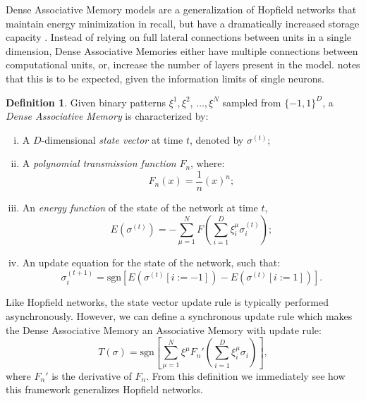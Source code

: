 \documentclass{article}
\theoremstyle{definition}
\newtheorem{definition}{Definition}[subsection]
\begin{document}
Dense Associative Memory models are a generalization of Hopfield networks that
maintain energy minimization in recall, but have a dramatically
increased storage capacity \parencite{krotov_dense_2016,demircigil_model_2017}.
Instead of relying on full lateral connections between units in a
single dimension,
Dense Associative Memories either have multiple connections between
computational units, or, increase the number of layers present in the model.
\textcite{krotov_large_2021} notes that this is to be expected, given the
information limits of single neurons.

\begin{definition}
  Given binary patterns $\xi^1, \xi^2$, $\dots, \xi^N$ sampled from
  $\{-1, 1\}^D$,
  a \textit{Dense Associative Memory} is characterized by:
  \begin{enumerate}[(i)]
    \item A $D$-dimensional \textit{state vector} at time $t$,
      denoted by $\sigma^{(t)}$;
    \item A \textit{polynomial transmission function} $F_n$, where:
      \begin{equation}
        F_n (x) = \frac{1}{n} (x)^n;
      \end{equation}
    \item An \textit{energy function} of the state of the network at time $t$,
      \begin{equation}
        E(\sigma^{(t)}) = - \sum^N_{\mu=1} F \left( \sum^D_{i=1}
        \xi^\mu_i \sigma^{(t)}_i \right);
      \end{equation}
    \item An update equation for the state of the network, such that:
      \begin{equation}
        \sigma^{(t+1)}_i = \text{sgn} \left[ E(\sigma^{(t)}[i := -1])
        - E(\sigma^{(t)}[i := 1]) \right].
      \end{equation}
  \end{enumerate}
\end{definition}

Like Hopfield networks, the state vector update rule is typically
performed asynchronously.
However, we can define a synchronous update rule which makes the
Dense Associative
Memory an Associative Memory with update rule:
\begin{equation}
  T(\sigma) = \text{sgn} \left[\sum^N_{\mu=1} \xi^\mu F_n' \left(
  \sum^D_{i=1} \xi^\mu_i \sigma_i \right)\right],
\end{equation}
where $F_n'$ is the derivative of $F_n$. From this definition we immediately
see how this framework generalizes Hopfield networks.
\end{document}

